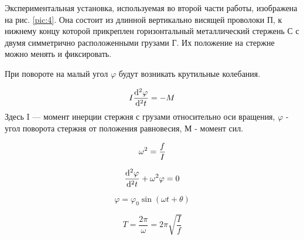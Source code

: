 \documentclass[a4paper,12pt]{article}
\begin{document}
Экспериментальная установка, используемая во второй части работы,
изображена на рис. \ref{pic:4}. Она состоит из длинной вертикально висящей проволоки П, к нижнему концу которой прикреплен горизонтальный металлический стержень С с двумя симметрично расположенными грузами Г. Их положение на стержне можно менять и фиксировать.

При повороте на малый угол $\varphi$ будут возникать крутильные колебания.

\begin{equation}
  I \deriv[2]{\varphi}{t} = -M \label{eq:2.8}
\end{equation}
Здесь I — момент инерции стержня с грузами относительно оси вращения, $\varphi$ - угол поворота стержня от положения равновесия, М - момент сил.

\begin{equation}
  \w^2 = \frac{f}{I} \label{eq:2.9}
\end{equation}

\begin{equation}
  \deriv[2]{\varphi}{t} + \w^2\varphi = 0 \label{eq:2.10}
\end{equation}

\begin{equation}
  \varphi = \varphi_0 \sin{(\omega t + \theta)} \label{eq:2.11}
\end{equation}

\begin{equation}
  T = \frac{2\pi}{\omega} = 2\pi \sqrt{\frac{I}{f}} \label{eq:2.12}
\end{equation}
\end{document}
